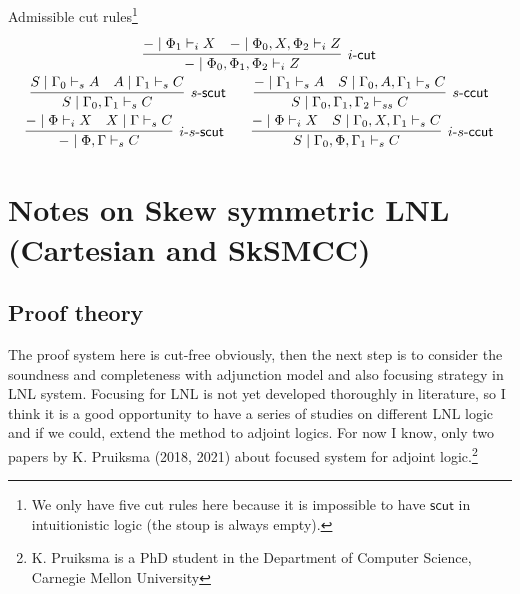 \documentclass{article}
\newcommand{\td}{\text{-}}
\newcommand{\scut}{\mathsf{scut}}
\newcommand{\ccut}{\mathsf{ccut}}
\begin{document}
  Admissible cut rules\footnote{We only have five cut rules here because it is impossible to have $\scut$ in intuitionistic logic (the stoup is always empty).}
  \begin{displaymath}
    \begin{array}{cc}
      \infer[i\td\mathsf{cut}]{- \mid \Phi_{0} , \Phi_{1} , \Phi_{2} \vdash_{i} Z}{
       \deduce{- \mid \Phi_{1} \vdash_{i} X}{}
       &
       \deduce{- \mid \Phi_{0} , X , \Phi_{2} \vdash_{i} Z}{}
      }
       \\
       \infer[s\td\scut]{S \mid \Gamma_{0} , \Gamma_{1} \vdash_{s} C}{
        \deduce{S \mid \Gamma_{0} \vdash_{s} A}{}
        &
        \deduce{A \mid \Gamma_{1} \vdash_{s} C}{}
       }
       \qquad
       \infer[s\td\ccut]{S \mid \Gamma_{0} , \Gamma_{1} , \Gamma_{2} \vdash_{ss} C}{
        \deduce{- \mid \Gamma_{1} \vdash_{s} A}{}
        &
        \deduce{S \mid \Gamma_{0} , A , \Gamma_{1} \vdash_{s} C}{}
      }
      \\
      \infer[i\td s \td\scut]{- \mid \Phi , \Gamma \vdash_{s} C}{
       \deduce{- \mid \Phi \vdash_{i} X}{}
       &
       \deduce{X \mid \Gamma \vdash_{s} C}{}
      }
      \qquad
      \infer[i\td s\td\ccut]{S \mid \Gamma_{0} , \Phi , \Gamma_{1} \vdash_{s} C}{
       \deduce{- \mid \Phi \vdash_{i} X}{}
       &
       \deduce{S \mid \Gamma_{0} , X , \Gamma_{1} \vdash_{s} C}{}
      }
    \end{array}
  \end{displaymath}
  \section*{Notes on Skew symmetric LNL (Cartesian and SkSMCC)}
  \subsection*{Proof theory}
  The proof system here is cut-free obviously, then the next step is to consider the soundness and completeness with adjunction model and also focusing strategy in LNL system.
  Focusing for LNL is not yet developed thoroughly in literature, so I think it is a good opportunity to have a series of studies on different LNL logic and if we could, extend the method to adjoint logics.
  For now I know, only two papers by K. Pruiksma (2018, 2021) about focused system for adjoint logic.\footnote{K. Pruiksma is a PhD student in the Department of Computer Science, Carnegie Mellon University}
\end{document}
